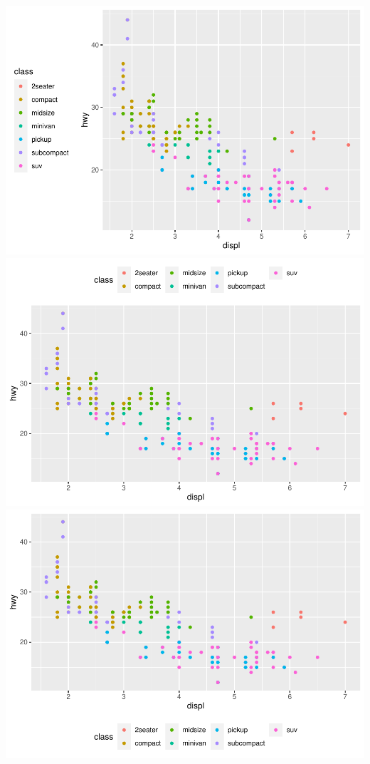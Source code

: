 \documentclass[
]{article}
\begin{document}
\includegraphics{rmarkdown_tutorial_files/figure-latex/unnamed-chunk-22-1.pdf}
\includegraphics{rmarkdown_tutorial_files/figure-latex/unnamed-chunk-22-2.pdf}
\includegraphics{rmarkdown_tutorial_files/figure-latex/unnamed-chunk-22-3.pdf}
\end{document}
